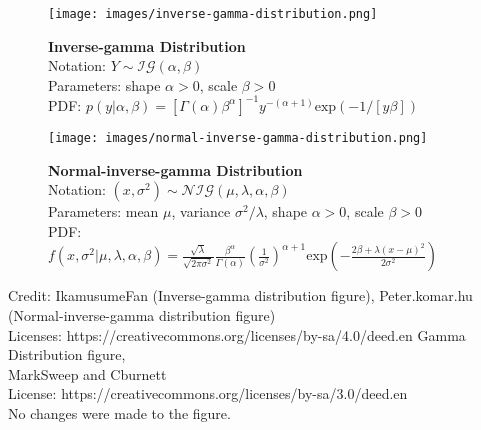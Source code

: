 \documentclass[11pt]{article}
\begin{document}
\begin{minipage}{.3\textwidth}
\begin{figure}
\texttt{[image: images/inverse-gamma-distribution.png]}
\caption*{%
  \scriptsize
  {\bfseries Inverse-gamma Distribution}\\[.5\baselineskip]
  Notation: $Y \sim \mathcal{IG}(\alpha, \beta)$ \\[.5\baselineskip]
  Parameters: shape $\alpha > 0$, scale $\beta > 0$ \\[.5\baselineskip]
  PDF: $ p(y | \alpha, \beta) = [\Gamma(\alpha)\beta^\alpha]^{-1}y^{-(\alpha + 1)}\text{exp}(-1/[y\beta])$
}
\end{figure}
\end{minipage}\hspace{.15\textwidth}%
\begin{minipage}{.55\textwidth}
\begin{figure}
\texttt{[image: images/normal-inverse-gamma-distribution.png]}
\caption*{%
  \scriptsize
  {\bfseries Normal-inverse-gamma Distribution}\\[.5\baselineskip]
  Notation: $(x, \sigma^2) \sim \mathcal{NIG}(\mu, \lambda, \alpha, \beta)$ \\[.5\baselineskip]
  Parameters: mean $\mu$, variance $\sigma^2/\lambda$, shape $\alpha > 0$, scale $\beta > 0$ \\[.5\baselineskip]
  PDF: $f(x, \sigma^2 | \mu, \lambda, \alpha, \beta) = \frac{\sqrt{\lambda}}{\sqrt{2\pi\sigma^2}}\frac{\beta^\alpha}{\Gamma(\alpha)}\left(\frac{1}{\sigma^2} \right)^{\alpha + 1}\text{exp}\left( -\frac{2\beta + \lambda(x - \mu)^2}{2\sigma^2} \right)$
 }
\end{figure}
\end{minipage}

\vfill
\begin{spacing}{0.5}
  {\tiny Credit: IkamusumeFan (Inverse-gamma distribution figure), Peter.komar.hu (Normal-inverse-gamma distribution figure)\\[.375\baselineskip]
  Licenses: https://creativecommons.org/licenses/by-sa/4.0/deed.en}
  {\tiny Gamma Distribution figure, \\ MarkSweep and Cburnett \\ License: https://creativecommons.org/licenses/by-sa/3.0/deed.en\\[-1\baselineskip] No changes were made to the figure.}
\end{spacing}
\end{document}
